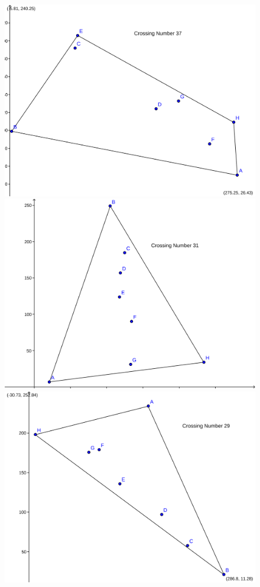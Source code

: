 \documentclass[11pt,epsf,times,letterpaper]{article}
\begin{document}
\begin{figure}
		\includegraphics[scale=.15]{png/o2298.png}
		\includegraphics[scale=.15]{png/o2394.png}
		\includegraphics[scale=.15]{png/o2474.png}

\end{figure}
\end{document}
